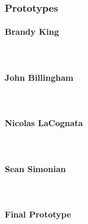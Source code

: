 \subsubsection{Prototypes}

\paragraph{Brandy King}\mbox{}\\


\paragraph{John Billingham}\mbox{}\\


\paragraph{Nicolas LaCognata}\mbox{}\\


\paragraph{Sean Simonian}\mbox{}\\


\paragraph{Final Prototype}
